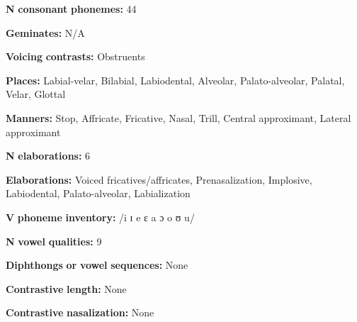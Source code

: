 \begin{styleBody}
\textbf{N} \textbf{consonant} \textbf{phonemes:} 44
\end{styleBody}

\begin{styleBody}
\textbf{Geminates:} N/A
\end{styleBody}

\begin{styleBody}
\textbf{Voicing} \textbf{contrasts:} Obstruents
\end{styleBody}

\begin{styleBody}
\textbf{Places:} Labial-velar, Bilabial, Labiodental, Alveolar, Palato-alveolar, Palatal, Velar, Glottal
\end{styleBody}

\begin{styleBody}
\textbf{Manners:} Stop, Affricate, Fricative, Nasal, Trill, Central approximant, Lateral approximant
\end{styleBody}

\begin{styleBody}
\textbf{N} \textbf{elaborations:} 6
\end{styleBody}

\begin{styleBody}
\textbf{Elaborations:} Voiced fricatives/affricates, Prenasalization, Implosive, Labiodental, Palato-alveolar, Labialization
\end{styleBody}

\begin{styleBody}
\textbf{V} \textbf{phoneme} \textbf{inventory:} /i ɪ e ɛ a ɔ o ʊ u/
\end{styleBody}

\begin{styleBody}
\textbf{N} \textbf{vowel} \textbf{qualities:} 9
\end{styleBody}

\begin{styleBody}
\textbf{Diphthongs} \textbf{or} \textbf{vowel} \textbf{sequences:} None
\end{styleBody}

\begin{styleBody}
\textbf{Contrastive} \textbf{length:} None
\end{styleBody}

\begin{styleBody}
\textbf{Contrastive} \textbf{nasalization:} None
\end{styleBody}

